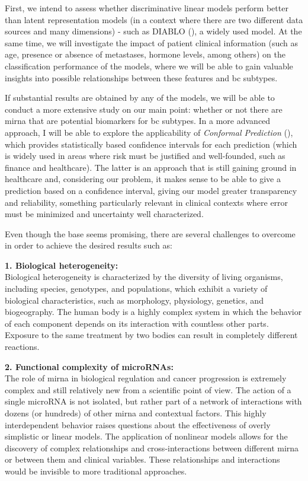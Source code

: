 First, we intend to assess whether discriminative linear models perform better
than latent representation models (in a context where there are two different
data sources and many dimensions) - such as DIABLO (\textcite{DIABLO_Singh2019}),
a widely used model. At the same time, we will investigate the impact of
patient clinical information (such as age, presence or absence of metastases,
hormone levels, among others) on the classification performance of the models,
where we will be able to gain valuable insights into possible relationships
between these features and \gls{bc} subtypes.

If substantial results are obtained by any of the models, we will be able to
conduct a more extensive study on our main point: whether or not there are
\gls{mirna} that are potential biomarkers for \gls{bc} subtypes. In a
more advanced approach, I will be able to explore the applicability of
\textit{Conformal Prediction} (\textcite{conformal_prediction_Angelopoulos2023}),
which provides statistically based confidence intervals for each prediction
(which is widely used in areas where risk must be justified and well-founded,
such as finance and healthcare). The latter is an approach that is still
gaining ground in healthcare and, considering our problem, it makes sense to be
able to give a prediction based on a confidence interval, giving our model
greater transparency and reliability, something particularly relevant in
clinical contexts where error must be minimized and uncertainty well
characterized.

Even though the base seems promising, there are several challenges to overcome
in order to achieve the desired results such as:

\textbf{1. Biological heterogeneity:} \\
\label{sec:biological-heterogeneity}
Biological heterogeneity is characterized by the diversity of living organisms,
including species, genotypes, and populations, which exhibit a variety of
biological characteristics, such as morphology, physiology, genetics, and biogeography.
The human body is a highly complex system in which the behavior of each
component depends on its interaction with countless other parts.
Exposure to the same treatment by two bodies can result in completely different
reactions.

\textbf{2. Functional complexity of microRNAs:} \\
The role of \gls{mirna} in biological regulation and cancer progression is
extremely complex and still relatively new from a scientific point of view.
The action of a single microRNA is not isolated, but rather part of a network
of interactions with dozens (or hundreds) of other \gls{mirna} and contextual
factors. This highly interdependent behavior raises questions about the
effectiveness of overly simplistic or linear models. The application of
nonlinear models allows for the discovery of complex relationships and
cross-interactions between different \gls{mirna} or between them and clinical
variables. These relationships and interactions would be invisible to more
traditional approaches.

